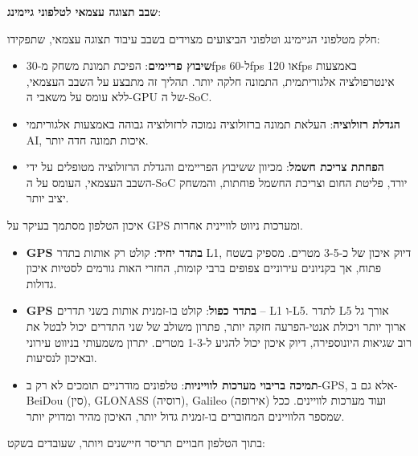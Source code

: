 \textbf{שבב תצוגה עצמאי לטלפוני גיימינג}:

חלק מטלפוני הגיימינג וטלפוני הביצועים מצוידים בשבב עיבוד תצוגה עצמאי, שתפקידו:

\begin{itemize}
  \item \textbf{שיבוץ פריימים}: הפיכת תמונת משחק מ-30fps ל-60fps או 120fps באמצעות אינטרפולציה אלגוריתמית, התמונה חלקה יותר. תהליך זה מתבצע על השבב העצמאי, ללא עומס על משאבי ה-GPU של ה-SoC.
  \item \textbf{הגדלת רזולוציה}: העלאת תמונה ברזולוציה נמוכה לרזולוציה גבוהה באמצעות אלגוריתמי AI, איכות תמונה חדה יותר.
  \item \textbf{הפחתת צריכת חשמל}: מכיוון ששיבוץ הפריימים והגדלת הרזולוציה מטופלים על ידי השבב העצמאי, העומס על ה-SoC יורד, פליטת החום וצריכת החשמל פוחתות, והמשחק יציב יותר.
\end{itemize}


איכון הטלפון מסתמך בעיקר על GPS ומערכות ניווט לוויינית אחרות.

\begin{itemize}
  \item \textbf{GPS בתדר יחיד}: קולט רק אותות בתדר L1, דיוק איכון של כ-3-5 מטרים. מספיק בשטח פתוח, אך בקניונים עירוניים צפופים ברבי קומות, החזרי האות גורמים לסטיות איכון גדולות.
  \item \textbf{GPS בתדר כפול}: קולט בו-זמנית אותות בשני תדרים – L1 ו-L5. לתדר L5 אורך גל ארוך יותר ויכולת אנטי-הפרעה חזקה יותר, פתרון משולב של שני התדרים יכול לבטל את רוב שגיאות היונוספירה, דיוק איכון יכול להגיע ל-1-3 מטרים. יתרון משמעותי בניווט עירוני ובאיכון לנסיעות.
  \item \textbf{תמיכה בריבוי מערכות לווייניות}: טלפונים מודרניים תומכים לא רק ב-GPS, אלא גם ב-BeiDou (סין), GLONASS (רוסיה), Galileo (אירופה) ועוד מערכות לוויינים. ככל שמספר הלוויינים המחוברים בו-זמנית גדול יותר, האיכון מהיר ומדויק יותר.
\end{itemize}


בתוך הטלפון חבויים תריסר חיישנים ויותר, שעובדים בשקט:

